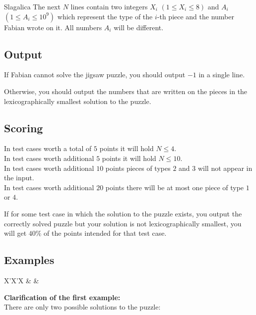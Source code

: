 \begin{statement}[
  problempoints=70,
  timelimit=1 second,
  memorylimit=512 MiB,
]{Slagalica}
The next $N$ lines contain two integers $X_i$ $(1 \le X_i \le 8)$ and $A_i$
$(1 \le A_i \le 10^9)$ which represent the type of the $i$-th piece and the
number Fabian wrote on it. All numbers $A_i$ will be different.

\subsection*{Output}
If Fabian cannot solve the jigsaw puzzle, you should output $-1$ in a single
line.

Otherwise, you should output the numbers that are written on the pieces in the
lexicographically smallest solution to the puzzle.

\subsection*{Scoring}
In test cases worth a total of $5$ points it will hold $N \le 4$.\\
In test cases worth additional $5$ points it will hold $N \le 10$.\\
In test cases worth additional $10$ points pieces of types $2$ and $3$ will not
                                            appear in the input.\\
In test cases worth additional $20$ points there will be at most one piece of
                                           type $1$ or $4$.

If for some test case in which the solution to the puzzle exists, you output the
correctly solved puzzle but your solution is not lexicographically smallest, you
will get $40\%$ of the points intended for that test case.

\subsection*{Examples}
\begin{tabularx}{\textwidth}{X'X'X}
 &
 &
\end{tabularx}

\textbf{Clarification of the first example:}\\
There are only two possible solutions to the puzzle:\\


\end{statement}
